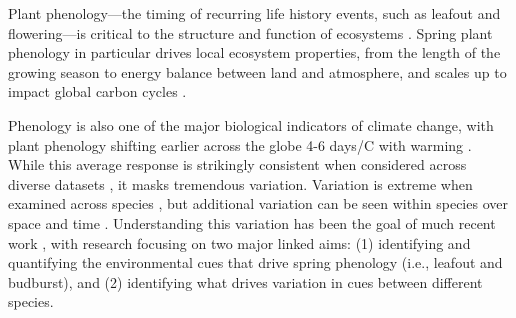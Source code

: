 \documentclass[11pt]{article}
\begin{document}

\newpage
\linenumbers

Plant phenology---the timing of recurring life history events, such as leafout and flowering---is critical to the structure and function of ecosystems \citep{Cleland:2007aa}. Spring plant phenology in particular drives local ecosystem properties, from the length of the growing season to energy balance between land and atmosphere, and scales up to impact global carbon cycles \citep{Richardson:2009aa}. %

Phenology is also one of the major biological indicators of climate change, with plant phenology shifting earlier across the globe 4-6 days/\degree C with warming \citep{IPCC:2014sm}. While this average response is strikingly consistent when considered across diverse datasets \citep{Wolkovich:2012aa}, it masks tremendous variation. Variation is extreme when examined across species \citep{Wolkovich:2014ab}, but additional variation can be seen within species over space \citep{vitasselev,kramer2017} and time \citep{yu2010,fu2015}. Understanding this variation has been the goal of much recent work \citep{Rutishauser:2008fu,Laube2015,donnelly2017,zohner2017}, with research focusing on two major linked aims: (1) identifying and quantifying the environmental cues that drive spring phenology (i.e., leafout and budburst), and (2) identifying what drives variation in cues between different species.
\end{document}
